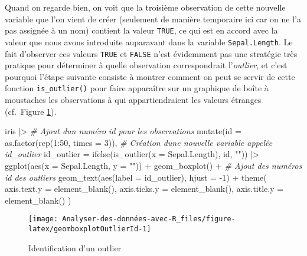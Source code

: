 \documentclass[
]{book}
\newenvironment{Shaded}{\begin{snugshade}}{\end{snugshade}}
\newcommand{\AttributeTok}[1]{\textcolor[rgb]{0.77,0.63,0.00}{#1}}
\newcommand{\CommentTok}[1]{\textcolor[rgb]{0.56,0.35,0.01}{\textit{#1}}}
\newcommand{\DecValTok}[1]{\textcolor[rgb]{0.00,0.00,0.81}{#1}}
\newcommand{\FunctionTok}[1]{\textcolor[rgb]{0.00,0.00,0.00}{#1}}
\newcommand{\NormalTok}[1]{#1}
\newcommand{\SpecialCharTok}[1]{\textcolor[rgb]{0.00,0.00,0.00}{#1}}
\newcommand{\StringTok}[1]{\textcolor[rgb]{0.31,0.60,0.02}{#1}}
\begin{document}
Quand on regarde bien, on voit que la troisième observation de cette nouvelle variable que l'on vient de créer (seulement de manière temporaire ici car on ne l'a pas assignée à un nom) contient la valeur \texttt{TRUE}, ce qui est en accord avec la valeur que nous avons introduite auparavant dans la variable \texttt{Sepal.Length}. Le fait d'observer ces valeurs \texttt{TRUE} et \texttt{FALSE} n'est évidemment pas une stratégie très pratique pour déterminer à quelle observation correspondrait l'\emph{outlier}, et c'est pourquoi l'étape suivante consiste à montrer comment on peut se servir de cette fonction \texttt{is\_outlier()} pour faire apparaître sur un graphique de boîte à moustaches les observations à qui appartiendraient les valeurs étranges (cf.~Figure \ref{fig:geomboxplotOutlierId}).

\begin{Shaded}
\begin{Highlighting}[]
\NormalTok{iris }\SpecialCharTok{|\textgreater{}}
  \CommentTok{\# Ajout d\textquotesingle{}un numéro id pour les observations}
  \FunctionTok{mutate}\NormalTok{(}\AttributeTok{id =} \FunctionTok{as.factor}\NormalTok{(}\FunctionTok{rep}\NormalTok{(}\DecValTok{1}\SpecialCharTok{:}\DecValTok{50}\NormalTok{, }\AttributeTok{times =} \DecValTok{3}\NormalTok{)),}
         \CommentTok{\# Création d\textquotesingle{}une nouvelle variable appelée id\_outlier}
         \AttributeTok{id\_outlier =} \FunctionTok{ifelse}\NormalTok{(}\FunctionTok{is\_outlier}\NormalTok{(}\AttributeTok{x =}\NormalTok{ Sepal.Length), id, }\StringTok{""}\NormalTok{)) }\SpecialCharTok{|\textgreater{}}
  \FunctionTok{ggplot}\NormalTok{(}\FunctionTok{aes}\NormalTok{(}\AttributeTok{x =}\NormalTok{ Sepal.Length, }\AttributeTok{y =} \StringTok{""}\NormalTok{)) }\SpecialCharTok{+}
  \FunctionTok{geom\_boxplot}\NormalTok{() }\SpecialCharTok{+}
  \CommentTok{\# Ajout des numéros id des outliers}
  \FunctionTok{geom\_text}\NormalTok{(}\FunctionTok{aes}\NormalTok{(}\AttributeTok{label =}\NormalTok{ id\_outlier),  }\AttributeTok{hjust =} \SpecialCharTok{{-}}\DecValTok{1}\NormalTok{) }\SpecialCharTok{+}
  \FunctionTok{theme}\NormalTok{(}
    \AttributeTok{axis.text.y =} \FunctionTok{element\_blank}\NormalTok{(),}
    \AttributeTok{axis.ticks.y =} \FunctionTok{element\_blank}\NormalTok{(),}
    \AttributeTok{axis.title.y =} \FunctionTok{element\_blank}\NormalTok{()}
\NormalTok{  )}
\end{Highlighting}
\end{Shaded}

\begin{figure}

{\centering \texttt{[image: Analyser-des-données-avec-R\_files/figure-latex/geomboxplotOutlierId-1]} 

}

\caption{Identification d'un outlier}\label{fig:geomboxplotOutlierId}
\end{figure}
\end{document}
